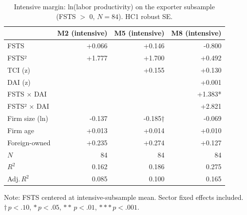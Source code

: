 \begin{table}[ht]
\centering
\caption{Intensive margin: ln(labor productivity) on the exporter subsample (FSTS $>$ 0, $N=84$). HC1 robust SE.}
\label{tab:intensive}
\begin{tabular}{lrrr}
\toprule
 & M2 (intensive) & M5 (intensive) & M8 (intensive) \\
\midrule
FSTS & +0.066 & +0.146 & -0.800 \\
FSTS² & +1.777 & +1.700 & +0.492 \\
TCI (z) &  & +0.155 & +0.130 \\
DAI (z) &  &  & +0.001 \\
FSTS × DAI &  &  & +1.383* \\
FSTS² × DAI &  &  & +2.821 \\
Firm size (ln) & -0.137 & -0.185† & -0.069 \\
Firm age & +0.013 & +0.014 & +0.010 \\
Foreign-owned & +0.235 & +0.274 & +0.127 \\
\midrule
$N$ & 84 & 84 & 84 \\
$R^2$ & 0.162 & 0.186 & 0.275 \\
Adj.\,$R^2$ & 0.085 & 0.100 & 0.165 \\
\bottomrule
\end{tabular}
\par\smallskip
\footnotesize Note: FSTS centered at intensive-subsample mean. Sector fixed effects included. $\dagger\,p<.10$, $*\,p<.05$, $**\,p<.01$, $***\,p<.001$.
\end{table}